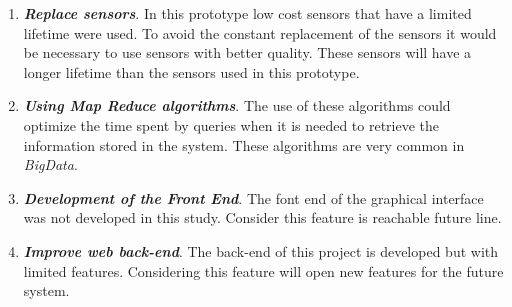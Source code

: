 \begin{enumerate}
\item \textbf{\textit{Replace sensors}}. In this prototype low cost sensors that have a limited lifetime were used. To avoid the constant replacement of the sensors it would be necessary to use sensors with better quality. These sensors will have a longer lifetime than the sensors used in this prototype.

\item \textbf{\textit{Using Map Reduce algorithms}}. The use of these algorithms could optimize the time spent by queries when it is needed to retrieve the information stored in the system. These algorithms are very common in \textit{BigData}.

\item \textbf{\textit{Development of the Front End}}. The font end of the graphical interface was not developed in this study. Consider this feature is reachable future line.

\item \textbf{\textit{Improve web back-end}}. The back-end of this project is developed but with limited features. Considering this feature will open new features for the future system.

\end{enumerate}



\newpage
\newpage